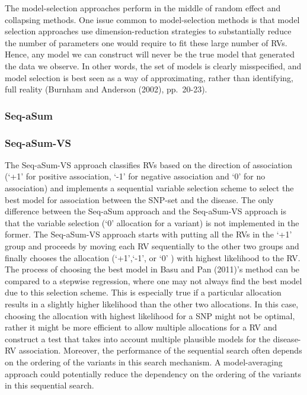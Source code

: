 \documentclass[
]{book}
\begin{document}
The model-selection approaches perform in the middle of random eﬀect and collapsing methods. One issue common to model-selection methods is that model selection approaches use dimension-reduction strategies to substantially reduce the number of parameters one would require to ﬁt these large number of RVs. Hence, any model we can construct will never be the true model that generated the data we observe. In other words, the set of models is clearly misspeciﬁed, and model selection is best seen as a way of approximating, rather than identifying, full reality (Burnham and Anderson (2002), pp.~20-23).

\hypertarget{seq-asum}{%
\subsubsection{Seq-aSum}\label{seq-asum}}

\hypertarget{seq-asum-vs}{%
\subsubsection{Seq-aSum-VS}\label{seq-asum-vs}}

The Seq-aSum-VS approach classiﬁes RVs based on the direction of association (`+1' for positive association, `-1' for negative association and `0' for no association) and implements a sequential variable selection scheme to select the best model for association between the SNP-set and the disease. The only diﬀerence between the Seq-aSum approach and the Seq-aSum-VS approach is that the variable selection (`0' allocation for a variant) is not implemented in the former. The Seq-aSum-VS approach starts with putting all the RVs in the `+1' group and proceeds by moving each RV sequentially to the other two groups and ﬁnally chooses the allocation (`+1',`-1', or `0' ) with highest likelihood to the RV. The process of choosing the best model in Basu and Pan (2011)'s method can be compared to a stepwise regression, where one may not always ﬁnd the best model due to this selection scheme. This is especially true if a particular allocation results in a slightly higher likelihood than the other two allocations. In this case, choosing the allocation with highest likelihood for a SNP might not be optimal, rather it might be more eﬃcient to allow multiple allocations for a RV and construct a test that takes into account multiple plausible models for the disease-RV association. Moreover, the performance of the sequential search often depends on the ordering of the variants in this search mechanism. A model-averaging approach could potentially reduce the dependency on the ordering of the variants in this sequential search.
\end{document}
